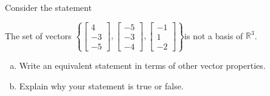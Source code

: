 
\begin{exerciseStatement}


Consider the statement 
\begin{center}\begin{minipage}{0.8\textwidth}
 The set of vectors \( \left\{ \left[\begin{array}{c}
4 \\
-3 \\
-5
\end{array}\right] , \left[\begin{array}{c}
-5 \\
-3 \\
-4
\end{array}\right] , \left[\begin{array}{c}
-1 \\
1 \\
-2
\end{array}\right] \right\} \)is not a basis of \(\mathbb{R}^3\). 
\end{minipage}\end{center}
    


\begin{enumerate}[(a)]
\item  Write an equivalent statement in terms of other vector properties.
\item  Explain why your statement is true or false.
\end{enumerate}
    
\end{exerciseStatement}
    
